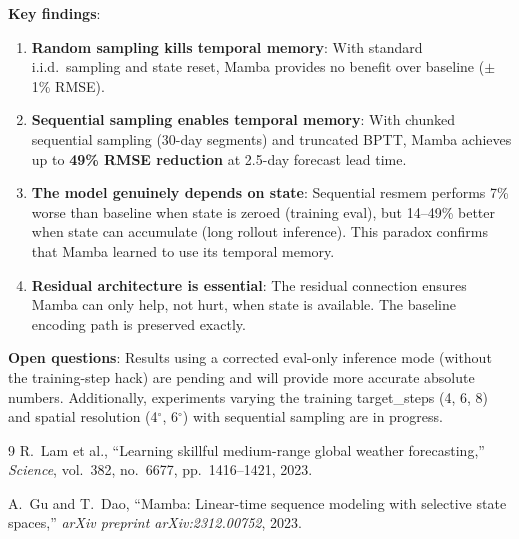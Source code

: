 \documentclass[11pt,a4paper]{article}
\begin{document}
\textbf{Key findings}:
\begin{enumerate}
  \item \textbf{Random sampling kills temporal memory}: With standard i.i.d.\ sampling and state reset, Mamba provides no benefit over baseline ($\pm$1\% RMSE).
  \item \textbf{Sequential sampling enables temporal memory}: With chunked sequential sampling (30-day segments) and truncated BPTT, Mamba achieves up to \textbf{49\% RMSE reduction} at 2.5-day forecast lead time.
  \item \textbf{The model genuinely depends on state}: Sequential resmem performs 7\% worse than baseline when state is zeroed (training eval), but 14--49\% better when state can accumulate (long rollout inference). This paradox confirms that Mamba learned to use its temporal memory.
  \item \textbf{Residual architecture is essential}: The residual connection ensures Mamba can only help, not hurt, when state is available. The baseline encoding path is preserved exactly.
\end{enumerate}

\textbf{Open questions}: Results using a corrected eval-only inference mode (without the training-step hack) are pending and will provide more accurate absolute numbers. Additionally, experiments varying the training target\_steps (4, 6, 8) and spatial resolution (4$^\circ$, 6$^\circ$) with sequential sampling are in progress.

\begin{thebibliography}{9}
R.~Lam et al., ``Learning skillful medium-range global weather forecasting,'' \textit{Science}, vol.~382, no.~6677, pp.~1416--1421, 2023.

A.~Gu and T.~Dao, ``Mamba: Linear-time sequence modeling with selective state spaces,'' \textit{arXiv preprint arXiv:2312.00752}, 2023.
\end{thebibliography}
\end{document}
